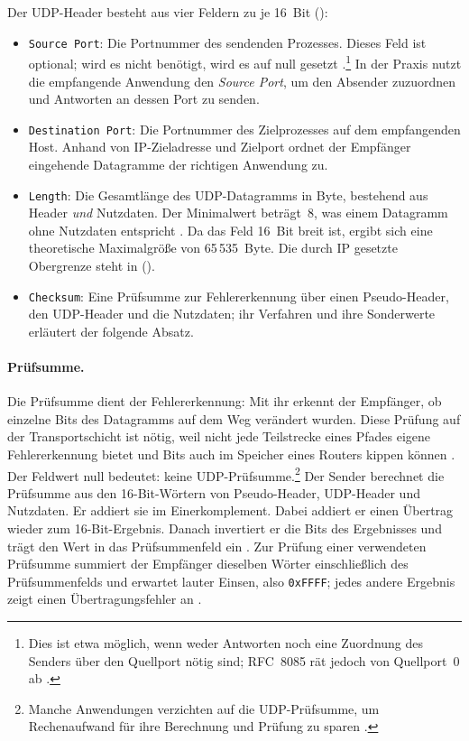 \newpage

Der UDP-Header besteht aus vier Feldern zu je 16~Bit ():

\begin{itemize}
    \item \texttt{Source Port}: Die Portnummer des sendenden Prozesses. Dieses Feld ist optional; wird es nicht
    benötigt, wird es auf null gesetzt \cite{rfc768}.\footnote{Dies ist etwa möglich, wenn weder Antworten noch
    eine Zuordnung des Senders über den Quellport nötig sind; RFC~8085 rät jedoch von Quellport~0 ab
    \cite[Sec.~5.1]{rfc8085}.} In der Praxis nutzt die empfangende Anwendung den \textit{Source Port},
    um den Absender zuzuordnen und Antworten an dessen Port zu senden.

    \item \texttt{Destination Port}: Die Portnummer des Zielprozesses auf dem empfangenden Host.
    Anhand von IP-Zieladresse und Zielport ordnet der Empfänger eingehende Datagramme der richtigen Anwendung zu.

    \item \texttt{Length}: Die Gesamtlänge des UDP-Datagramms in Byte, bestehend aus Header \emph{und} Nutzdaten.
    Der Minimalwert beträgt~8, was einem Datagramm ohne Nutzdaten entspricht \cite{rfc768}. Da das Feld 16~Bit
    breit ist, ergibt sich eine theoretische Maximalgröße von 65\,535~Byte. Die durch IP gesetzte Obergrenze
    steht in  ().

    \item \texttt{Checksum}: Eine Prüfsumme zur Fehlererkennung über einen Pseudo-Header, den UDP-Header
    und die Nutzdaten; ihr Verfahren und ihre Sonderwerte erläutert der folgende Absatz.
\end{itemize}

\paragraph{Prüfsumme.}
Die Prüfsumme dient der Fehlererkennung: Mit ihr erkennt der Empfänger, ob einzelne Bits des Datagramms auf
dem Weg verändert wurden. Diese Prüfung auf der Transportschicht ist nötig, weil nicht jede Teilstrecke
eines Pfades eigene Fehlererkennung bietet und Bits auch im Speicher eines Routers kippen können
\cite{kurose2021topdown}. Der Feldwert null bedeutet: keine UDP-Prüfsumme.\footnote{Manche Anwendungen
verzichten auf die UDP-Prüfsumme, um Rechenaufwand für ihre Berechnung und Prüfung zu sparen
\cite[Sec.~4.1.3.4]{rfc1122}.}
Der Sender berechnet die Prüfsumme aus den 16-Bit-Wörtern von Pseudo-Header, UDP-Header und Nutzdaten.
Er addiert sie im Einerkomplement. Dabei addiert er einen Übertrag wieder zum 16-Bit-Ergebnis.
Danach invertiert er die Bits des Ergebnisses und trägt den Wert in das Prüfsummenfeld ein
\cite{rfc768,rfc1071}. Zur Prüfung einer verwendeten Prüfsumme summiert der Empfänger dieselben Wörter
einschließlich des Prüfsummenfelds und erwartet lauter Einsen, also \texttt{0xFFFF}; jedes andere Ergebnis
zeigt einen Übertragungsfehler an \cite{rfc1071}.

